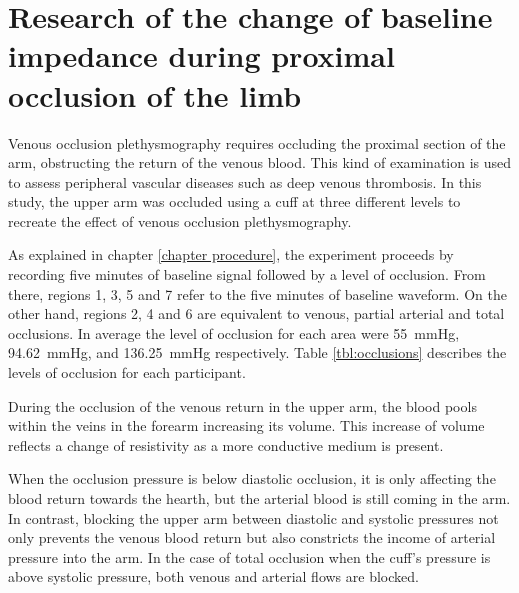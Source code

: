 
\chapter{Research of the change of baseline impedance during proximal occlusion of the limb}  %
\label{chapter occlusion}

\ifpdf
\graphicspath{{Chapter7/Figs/Raster/}{Chapter7/Figs/PDF/}{Chapter7/Figs/}}
\else
\graphicspath{{Chapter7/Figs/Vector/}{Chapter7/Figs/}}
\fi

Venous occlusion plethysmography requires occluding the proximal section of the arm, obstructing the return of the venous blood.  This kind of examination is used to assess peripheral vascular diseases such as deep venous thrombosis.  In this study, the upper arm was occluded using a cuff at three different levels to recreate the effect of venous occlusion plethysmography.

As explained in chapter \ref{chapter procedure}, the experiment proceeds by recording five minutes of baseline signal followed by a level of occlusion. From there, regions 1, 3, 5 and 7 refer to the five minutes of baseline waveform. On the other hand, regions 2, 4 and 6 are equivalent to venous, partial arterial and total occlusions. In average the level of occlusion for each area were \SI{55}{\mmHg}, \SI{94.62}{\mmHg}, and  \SI{136.25}{\mmHg} respectively. Table  \ref{tbl:occlusions} describes the levels of occlusion for each participant. 

During the occlusion of the venous return in the upper arm, the blood pools within the veins in the forearm increasing its volume. This increase of volume reflects a change of resistivity as a more conductive medium is present. 

When the occlusion pressure is below diastolic occlusion, it is only affecting the blood return towards the hearth, but the arterial blood is still coming in the arm. In contrast, blocking the upper arm between diastolic and systolic pressures not only prevents the venous blood return but also constricts the income of arterial pressure into the arm. In the case of total occlusion when the cuff's pressure is above systolic pressure, both venous and arterial flows are blocked. 

